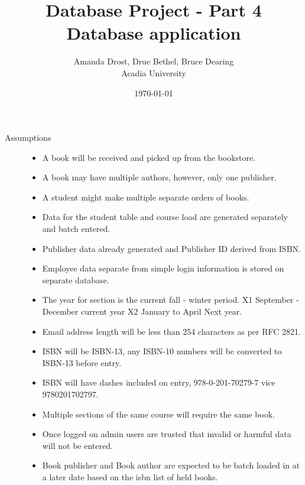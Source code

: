 \documentclass{article}
\begin{document}
\title{Database Project - Part 4 Database application}
    \author{Amanda Drost, Drue Bethel, Bruce Dearing\\
    Acadia University}
\date{\today}
\maketitle
\clearpage

\begin{description}

    \item[Assumptions] \hfill 
        \begin{itemize}
            \item A book will be received and picked up from the bookstore.
            \item A book may have multiple authors, however, only one publisher.
            \item A student might make multiple separate orders of books.
            \item Data for the student table and course load are generated separately
                 and batch entered.
            \item Publisher data already generated and Publisher ID derived from ISBN.
            \item Employee data separate from simple login information is stored on 
                  separate database.
            \item The year for section is the current fall - winter period. X1 September - December current year X2 January to April Next year.
            \item Email address length will be less than 254 characters as per RFC 2821.
            \item ISBN will be ISBN-13, any ISBN-10 numbers will be converted to ISBN-13 before entry.
            \item ISBN will have dashes included on entry, 978-0-201-70279-7 vice 9780201702797.
            \item Multiple sections of the same course will require the same book.

            \item Once logged on admin users are trusted that invalid or harmful  
                data will not be entered.
            \item Book publisher and Book author are expected to be batch loaded in at
				a later date based on the isbn list of held books.
        \end{itemize}
\end{description}
\end{document}
